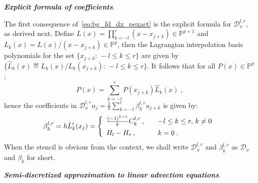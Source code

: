 \medskip

\noindent
\textbf{\textit{Explicit formula of coefficients}}.

\smallskip
The first consequence of~\cref{eq:bg_fd_dx_pexact} is the explicit formula for $\mathcal{D}^{l,r}_x$, as derived next.
Define $L(x)=\prod_{k=-l}^r(x-x_{j+k})\in\mathbb{P}^{p+1}$ and $L_k(x)=L(x)/(x-x_{j+k})\in\mathbb{P}^p$, then the Lagrangian interpolation basis polynomials for the set $\{x_{j+k}:\,-l\le k\le r\}$ are given by $\{\hat{L}_k(x)\eqdef L_k(x)/L_k(x_{j+k}):\,-l\le k\le r\}$.
It follows that for all $P(x)\in\mathbb{P}^p$:
\begin{displaymath}
  P(x) = \sum_{k=-l}^rP(x_{j+k})\hat{L}_k(x)\;,
\end{displaymath}
hence the coefficients in $\mathcal{D}^{l,r}_xu_j=\frac{1}{h}\sum_{k=-l}^r\beta_k^{l,r}u_{j+k}$ is given by:
\begin{equation}\label{eq:bg_fd_dx_coef}
  \beta_k^{l,r} = h\hat{L}_k'(x_j) = \left\{\begin{array}{lcl}
    \frac{(-1)^{k-1}}{k}C_k^{l,r}\,, & & -l\le k\le r,\,k\ne0 \\ \vspace{-.1in} \\
    H_l-H_r\,, & & k=0\;.
  \end{array}\right.
\end{equation}
When the stencil is obvious from the context, we shall write $\mathcal{D}_x^{l,r}$ and $\beta^{l,r}_k$ as $\mathcal{D}_x$ and $\beta_k$ for short.

\medskip

\noindent
\textbf{\textit{Semi-discretized approximation to linear advection equations}}.

